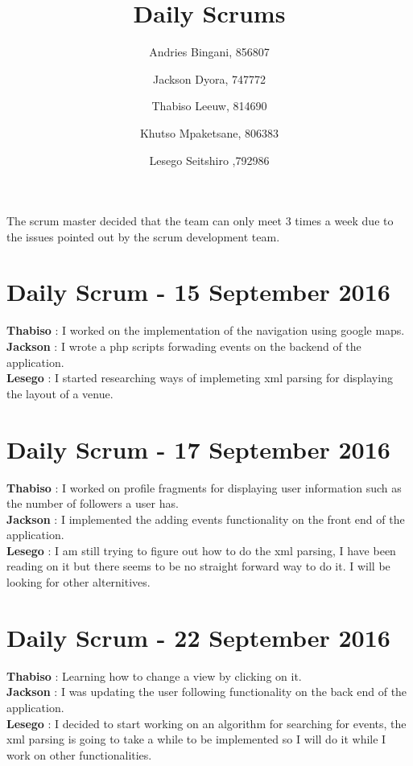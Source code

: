 \documentclass[10pt,a4paper]{article}
\title{Daily Scrums}
\author{
  Andries Bingani, 856807 \and
  Jackson Dyora, 747772\and
  Thabiso Leeuw, 814690 \and
  Khutso Mpaketsane, 806383 \and
  Lesego Seitshiro ,792986
}
\begin{document}
\maketitle

The scrum master decided that the team can only meet 3 times a week due to the issues pointed out by the scrum development team.

\section{Daily Scrum - 15 September 2016}
\textbf{Thabiso} : I worked on the implementation of the navigation using google maps.\\

\textbf{Jackson} : I wrote a php scripts forwading events on the backend of the application.\\

\textbf{Lesego} : I started researching ways of implemeting xml parsing for displaying the layout of a venue.\\
\section{Daily Scrum - 17 September 2016}
\textbf{Thabiso} : I worked on profile fragments for displaying user information such as the number of followers a user has.\\

\textbf{Jackson} : I implemented the adding events functionality on the front end of the application.\\

\textbf{Lesego} : I am still trying to figure out how to do the xml parsing, I have been reading on it but there seems to be no straight forward way to do it. I will be looking for other alternitives.\\

\section{Daily Scrum - 22 September 2016}
\textbf{Thabiso} : Learning how to change a view by clicking on it.\\

\textbf{Jackson} : I was updating the user following functionality on the back end of the application.\\

\textbf{Lesego} : I decided to start working on an algorithm for searching for events, the xml parsing is going to take a while to be implemented so I will do it while I work on other functionalities.\\
\end{document}
